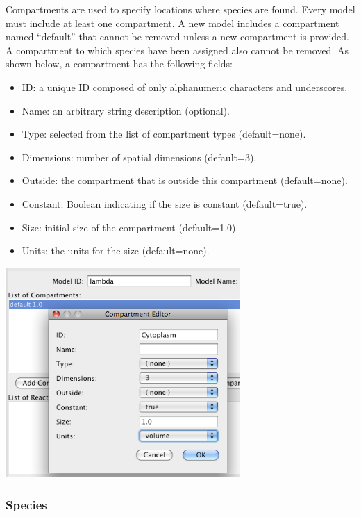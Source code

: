 \documentclass[titlepage,11pt]{article}
\begin{document}
\noindent
Compartments are used to specify locations where species are
found. Every model must include at least one compartment. A new
model includes a compartment named ``default'' that
cannot be removed unless a new compartment is provided.
A compartment to which species have been assigned also cannot be removed.  
As shown below, a compartment has the following fields:
\begin{itemize}
\item ID: a unique ID composed of only alphanumeric characters and 
      underscores.
\item Name: an arbitrary string description (optional).
\item Type: selected from the list of compartment types (default=none).
\item Dimensions: number of spatial dimensions (default=3).
\item Outside: the compartment that is outside this compartment 
       (default=none).
\item Constant: Boolean indicating if the size is constant
       (default=true).
\item Size: initial size of the compartment (default=1.0).
\item Units: the units for the size (default=none).
\end{itemize}
\begin{center}
\includegraphics[height=80mm]{screenshots/compartment}
\end{center}

\subsubsection{\label{species}Species}
\end{document}
